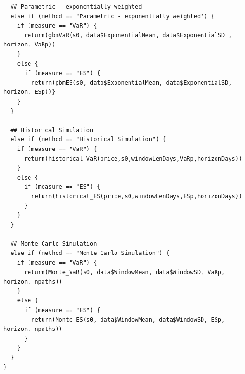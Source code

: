 \documentclass[letterpaper,11pt, oneside]{layout}
\begin{document}
\begin{spacing}{1}
\begin{lstlisting}
  ## Parametric - exponentially weighted
  else if (method == "Parametric - exponentially weighted") {
    if (measure == "VaR") {
      return(gbmVaR(s0, data$ExponentialMean, data$ExponentialSD , horizon, VaRp))
    }
    else {
      if (measure == "ES") {
        return(gbmES(s0, data$ExponentialMean, data$ExponentialSD, horizon, ESp))}
    }
  }

  ## Historical Simulation
  else if (method == "Historical Simulation") {
    if (measure == "VaR") {
      return(historical_VaR(price,s0,windowLenDays,VaRp,horizonDays))
    }
    else {
      if (measure == "ES") {
        return(historical_ES(price,s0,windowLenDays,ESp,horizonDays))
      }
    }
  }

  ## Monte Carlo Simulation
  else if (method == "Monte Carlo Simulation") {
    if (measure == "VaR") {
      return(Monte_VaR(s0, data$WindowMean, data$WindowSD, VaRp, horizon, npaths))
    }
    else {
      if (measure == "ES") {
        return(Monte_ES(s0, data$WindowMean, data$WindowSD, ESp, horizon, npaths))
      }
    }
  }
}
\end{lstlisting}
\end{spacing}


\end{document}
